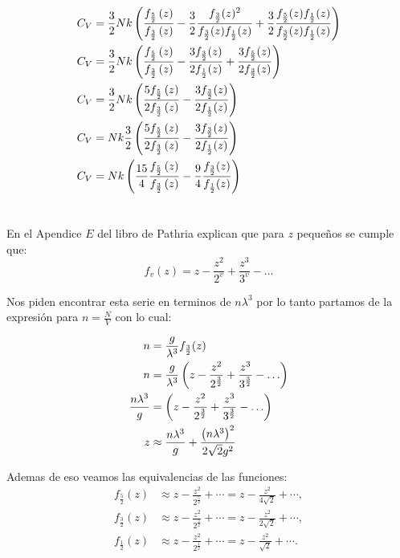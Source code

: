 \documentclass{report}
\begin{document}
\begin{align*}
  C_V &= \frac{3}{2}Nk\left( \frac{f_{\frac{5}{2}}\left(z\right)}{f_{\frac{3}{2}}\left(z\right)} - \frac{3}{2}\frac{f_{\frac{3}{2}}(z)^2}{f_{\frac{3}{2}}(z)f_{\frac{1}{2}}(z)}   + \frac{3}{2}\frac{f_{\frac{5}{2}}(z) f_{\frac{1}{2}}(z)}{f_{\frac{3}{2}}(z)f_{\frac{1}{2}}(z)} \right)\\
  C_V &= \frac{3}{2}Nk\left( \frac{f_{\frac{5}{2}}\left(z\right)}{f_{\frac{3}{2}}\left(z\right)} - \frac{3f_{\frac{3}{2}}(z)}{2f_{\frac{1}{2}}(z)}   + \frac{3f_{\frac{5}{2}}(z)}{2f_{\frac{3}{2}}(z)} \right)\\
  C_V &= \frac{3}{2}Nk\left( \frac{5f_{\frac{5}{2}}\left(z\right)}{2f_{\frac{3}{2}}\left(z\right)} - \frac{3f_{\frac{3}{2}}(z)}{2f_{\frac{1}{2}}(z)}\right)\\
  C_V &= Nk\frac{3}{2}\left( \frac{5f_{\frac{5}{2}}\left(z\right)}{2f_{\frac{3}{2}}\left(z\right)} - \frac{3f_{\frac{3}{2}}(z)}{2f_{\frac{1}{2}}(z)}\right)\\
  C_V &= Nk\left(\frac{15}{4}\frac{f_{\frac{5}{2}}\left(z\right)}{f_{\frac{3}{2}}\left(z\right)} - \frac{9}{4}\frac{f_{\frac{3}{2}}(z)}{f_{\frac{1}{2}}(z)}\right)\\
\end{align*}

\section{}

En el Apendice $E$ del libro de Pathria explican que para $z$ pequeños se cumple que:
\[
  f_v(z) = z - \frac{z^2}{2^v} + \frac{z^3}{3^v} - \ldots
\]

Nos piden encontrar esta serie en terminos de $n\lambda^3$ por lo tanto partamos de la expresión para $n = \frac{N}{V}$ con lo cual:

\begin{align*}
  n &= \frac{g}{\lambda^3}f_{\frac{3}{2}}(z)\\
  n &= \frac{g}{\lambda^3}\left(z - \frac{z^2}{2^{\frac{3}{2}}} + \frac{z^3}{3^{\frac{3}{2}}} - \ldots\right)\\
  \frac{n\lambda^3}{g} &= \left(z - \frac{z^2}{2^{\frac{3}{2}}} + \frac{z^3}{3^{\frac{3}{2}}} - \ldots\right)\\
  z &\approx \frac{n\lambda^3}{g} + \frac{\left(n\lambda^3\right)^2}{2\sqrt{2}g^2}
\end{align*}

Ademas de eso veamos las equivalencias de las funciones:
\begin{align*}
f_{\frac{5}{2}}(z) &\approx z - \frac{z^2}{2^{\frac{5}{2}}} + \cdots = z - \frac{z^2}{4\sqrt{2}} + \cdots, \\
f_{\frac{3}{2}}(z) &\approx z - \frac{z^2}{2^{\frac{3}{2}}} + \cdots = z - \frac{z^2}{2\sqrt{2}} + \cdots, \\
f_{\frac{1}{2}}(z) &\approx z - \frac{z^2}{2^{\frac{1}{2}}} + \cdots = z - \frac{z^2}{\sqrt{2}} + \cdots.
\end{align*}
\end{document}
